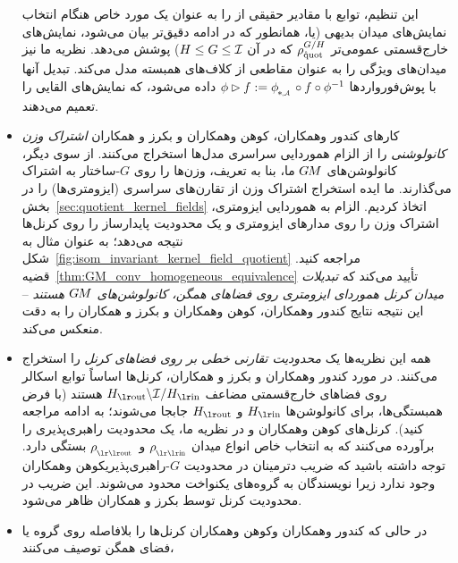 \begin{itemize}
	این تنظیم، توابع با مقادیر حقیقی از \cite{Kondor2018-GENERAL,bekkers2020bspline} را به عنوان یک مورد خاص هنگام انتخاب نمایش‌های میدان بدیهی
	(یا، همانطور که در ادامه دقیق‌تر بیان می‌شود، نمایش‌های خارج‌قسمتی عمومی‌تر $\rho_\textup{\r{quot}}^{G/H}$ که در آن $H\leq G\leq\mathcal{I}$) پوشش می‌دهد.
	نظریه ما نیز میدان‌های ویژگی را به عنوان مقاطعی از کلاف‌های همبسته مدل می‌کند.
	تبدیل آنها با پوش‌فورواردها $\phi \rhd f := \dphiA \circ f \circ \phi^{-1}$ داده می‌شود، که نمایش‌های القایی را تعمیم می‌دهند.
	\item[{\rule[2.2pt]{2pt}{2pt}}]
	کارهای کندور وهمکاران\cite{Kondor2018-GENERAL}، کوهن وهمکاران\cite{Cohen2018-intertwiners}\cite{Cohen2019-generaltheory} و بکرز و همکاران\cite{bekkers2020bspline} \emph{اشتراک وزن کانولوشنی} را از الزام هموردایی سراسری مدل‌ها استخراج می‌کنند.
	از سوی دیگر، کانولوشن‌های $G\mkern-1.4muM$ ما، بنا به تعریف، وزن‌ها را روی $G$-ساختار به اشتراک می‌گذارند.
	ما ایده استخراج اشتراک وزن از تقارن‌های سراسری (ایزومتری‌ها) را در بخش~\ref{sec:quotient_kernel_fields} اتخاذ کردیم.
	الزام به هموردایی ایزومتری، اشتراک وزن را روی مدارهای ایزومتری و یک محدودیت پایدارساز را روی کرنل‌ها نتیجه می‌دهد؛ به عنوان مثال به شکل~\ref{fig:isom_invariant_kernel_field_quotient} مراجعه کنید.
	قضیه~\ref{thm:GM_conv_homogeneous_equivalence} تأیید می‌کند که \emph{تبدیلات میدان کرنل هموردای ایزومتری روی فضاهای همگن، کانولوشن‌های $G\mkern-1.4muM$ هستند} -- این نتیجه نتایج کندور وهمکاران\cite{Kondor2018-GENERAL}، کوهن وهمکاران\cite{Cohen2018-intertwiners}\cite{Cohen2019-generaltheory} و بکرز و همکاران\cite{bekkers2020bspline}
	را به دقت منعکس می‌کند.
	\item[{\rule[2.2pt]{2pt}{2pt}}]
	همه این نظریه‌ها یک \emph{محدودیت تقارنی خطی بر روی فضاهای کرنل} را استخراج می‌کنند.
	در مورد کندور وهمکاران\cite{Kondor2018-GENERAL} و بکرز و همکاران\cite{bekkers2020bspline}، کرنل‌ها اساساً توابع اسکالر روی فضاهای خارج‌قسمتی مضاعف $\Hout\backslash \I/\Hin$ هستند (با فرض همبستگی‌ها، برای کانولوشن‌ها $\Hin$ و $\Hout$ جابجا می‌شوند؛ به ادامه مراجعه کنید).
	کرنل‌های کوهن وهمکاران\cite{Cohen2018-intertwiners}\cite{Cohen2019-generaltheory} و در نظریه ما، یک محدودیت راهبری‌پذیری را برآورده می‌کنند که به انتخاب خاص انواع میدان $\rhoin$ و~$\rhoout$ بستگی دارد.
	توجه داشته باشید که ضریب دترمینان در محدودیت $G$-راهبری‌پذیریکوهن وهمکاران \cite{Cohen2018-intertwiners}\cite{Cohen2019-generaltheory} وجود ندارد زیرا نویسندگان به گروه‌های یکنواخت محدود می‌شوند.
	این ضریب در محدودیت کرنل توسط بکرز و همکاران\cite{bekkers2020bspline} ظاهر می‌شود.
	\item[{\rule[2.2pt]{2pt}{2pt}}]
	در حالی که کندور وهمکاران\cite{Kondor2018-GENERAL} وکوهن وهمکاران \cite{Cohen2018-intertwiners}\cite{Cohen2019-generaltheory} کرنل‌ها را بلافاصله روی گروه یا فضای همگن توصیف می‌کنند،

\end{itemize}
